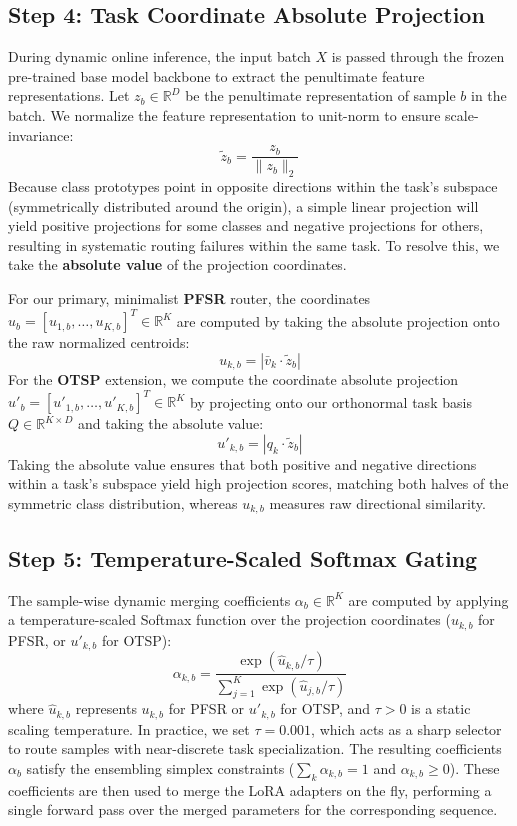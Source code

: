 \subsection{Step 4: Task Coordinate Absolute Projection}
During dynamic online inference, the input batch $X$ is passed through the frozen pre-trained base model backbone to extract the penultimate feature representations. Let $z_b \in \mathbb{R}^D$ be the penultimate representation of sample $b$ in the batch. We normalize the feature representation to unit-norm to ensure scale-invariance:
\begin{equation}
\tilde{z}_b = \frac{z_b}{\|z_b\|_2}
\end{equation}
Because class prototypes point in opposite directions within the task's subspace (symmetrically distributed around the origin), a simple linear projection will yield positive projections for some classes and negative projections for others, resulting in systematic routing failures within the same task. To resolve this, we take the \textbf{absolute value} of the projection coordinates.

For our primary, minimalist \textbf{PFSR} router, the coordinates $u_b = [u_{1, b}, \dots, u_{K, b}]^T \in \mathbb{R}^K$ are computed by taking the absolute projection onto the raw normalized centroids:
\begin{equation}
u_{k, b} = |\bar{v}_k \cdot \tilde{z}_b|
\end{equation}
For the \textbf{OTSP} extension, we compute the coordinate absolute projection $u'_b = [u'_{1, b}, \dots, u'_{K, b}]^T \in \mathbb{R}^K$ by projecting onto our orthonormal task basis $Q \in \mathbb{R}^{K \times D}$ and taking the absolute value:
\begin{equation}
u'_{k, b} = |q_k \cdot \tilde{z}_b|
\end{equation}
Taking the absolute value ensures that both positive and negative directions within a task's subspace yield high projection scores, matching both halves of the symmetric class distribution, whereas $u_{k,b}$ measures raw directional similarity.

\subsection{Step 5: Temperature-Scaled Softmax Gating}
The sample-wise dynamic merging coefficients $\alpha_b \in \mathbb{R}^K$ are computed by applying a temperature-scaled Softmax function over the projection coordinates ($u_{k, b}$ for PFSR, or $u'_{k, b}$ for OTSP):
\begin{equation}
\alpha_{k, b} = \frac{\exp(\hat{u}_{k, b} / \tau)}{\sum_{j=1}^K \exp(\hat{u}_{j, b} / \tau)}
\end{equation}
where $\hat{u}_{k, b}$ represents $u_{k, b}$ for PFSR or $u'_{k, b}$ for OTSP, and $\tau > 0$ is a static scaling temperature. In practice, we set $\tau = 0.001$, which acts as a sharp selector to route samples with near-discrete task specialization. The resulting coefficients $\alpha_b$ satisfy the ensembling simplex constraints ($\sum_k \alpha_{k,b} = 1$ and $\alpha_{k,b} \ge 0$). These coefficients are then used to merge the LoRA adapters on the fly, performing a single forward pass over the merged parameters for the corresponding sequence.

